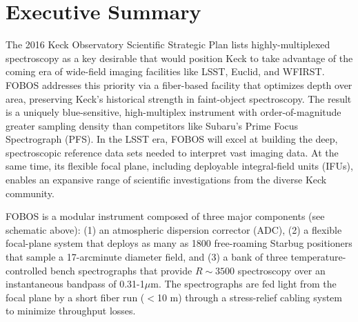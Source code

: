 
\vspace{-0.5cm}
\section{Executive Summary}


The 2016 Keck Observatory Scientific Strategic Plan lists
highly-multiplexed spectroscopy as a key desirable that would
position Keck to take advantage of the coming era of wide-field
imaging facilities like LSST, Euclid, and WFIRST. FOBOS addresses
this priority via a fiber-based facility that optimizes depth over
area, preserving Keck's historical strength in faint-object
spectroscopy. The result is a uniquely blue-sensitive, high-multiplex
instrument with order-of-magnitude greater sampling density than
competitors like Subaru's Prime Focus Spectrograph (PFS). In the LSST
era, FOBOS will excel at building the deep, spectroscopic reference
data sets needed to interpret vast imaging data. At the same time,
its flexible focal plane, including deployable integral-field units
(IFUs), enables an expansive range of scientific investigations from
the diverse Keck community.

FOBOS is a modular instrument composed of three major components (see
schematic above): (1) an atmospheric dispersion corrector (ADC), (2)
a flexible focal-plane system that deploys as many as 1800
free-roaming Starbug positioners that sample a 17-arcminute diameter
field, and (3) a bank of three temperature-controlled bench
spectrographs that provide $R \sim 3500$ spectroscopy over an
instantaneous bandpass of 0.31-1$\mu$m. The spectrographs are fed
light from the focal plane by a short fiber run ($<$10 m) through a
stress-relief cabling system to minimize throughput losses.

